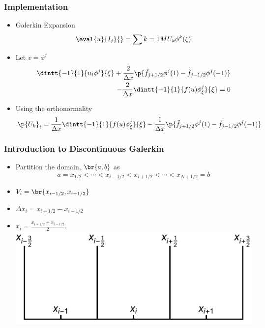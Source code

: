 \documentclass[10pt]{beamer}
\begin{document}
  \begin{frame}
    \frametitle{Implementation}
    \begin{itemize}
      \item Galerkin Expansion
        \[
          \eval{u}{I_j}{} = \sum{k = 1}{M}{U_k \phi^k(\xi)}
        \]

      \item Let $v = \phi^j$
        \begin{align*}
          \dintt{-1}{1}{u_t \phi^j}{\xi} + \frac{2}{\Delta x}\p{\hat{f}_{j+1/2} \phi^j(1) - \hat{f}_{j-1/2} \phi^j(-1)} \\
          - \frac{2}{\Delta x}\dintt{-1}{1}{f(u) \phi^j_{\xi}}{\xi} = 0
        \end{align*}
      \item Using the orthonormality
        \begin{align*}
          \p{U_k}_t = \frac{1}{\Delta x}\dintt{-1}{1}{f(u) \phi^j_{\xi}}{\xi} - \frac{1}{\Delta x}\p{\hat{f}_{j+1/2} \phi^j(1) - \hat{f}_{j-1/2} \phi^j(-1)}
        \end{align*}
    \end{itemize}
  \end{frame}

  \begin{frame}
    \frametitle{Introduction to Discontinuous Galerkin}
    \begin{itemize}
      \item Partition the domain, $\br{a, b}$ as
        \[
          a = x_{1/2} < \cdots < x_{i-1/2} < x_{i+1/2} < \cdots < x_{N + 1/2} = b
        \]

      \item $V_i = \br{x_{i-1/2}, x_{i+1/2}}$
      \item $\Delta x_i = x_{i + 1/2} - x_{i - 1/2}$
      \item $x_i = \frac{x_{i+1/2} + x_{i-1/2}}{2}$.
        \includegraphics[scale=0.35]{Figures/Cells.pdf}
    \end{itemize}
  \end{frame}
\end{document}
